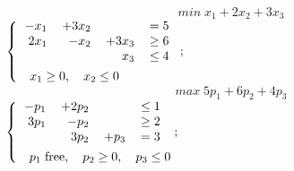\documentclass{article}
\begin{document}
\begin{preview}
\begin{center}
                        \begin{equation*}
                                min \; x_1 + 2 x_2 + 3 x_3
                        \end{equation*}
                        \begin{math}
                                \begin{dcases}
                                        \begin{tabular}{r r r l}
                                                $ - x_1 $ & $ + 3 x_2 $ & & $ = 5 $ \\
                                                $ 2 x_1 $ & $ - x_2 $ & $ + 3 x_3 $ & $ \geq{6} $ \\
                                                & & $ x_3 $ & $ \leq{4} $
                                        \end{tabular} \\
                                        \quad
                                        x_1 \geq{0}, \quad x_2 \leq{0}
                                \end{dcases};
                        \end{math}
                        \begin{equation*}
                                max \; 5 p_1 + 6 p_2 + 4 p_3
                        \end{equation*}
                        \begin{math}
                                \begin{dcases}
                                        \begin{tabular}{r r r l}
                                                $ - p_1 $ & $ + 2 p_2 $ & & $ \leq{1} $ \\
                                                $ 3 p_1 $ & $ - p_2 $ & & $ \geq{2} $ \\
                                                & $ 3 p_2 $ & $ + p_3 $ & $ = 3 $ \\
                                        \end{tabular} \\
                                        \quad
                                        p_1 \; \text{free},\quad p_2 \geq{0}, \quad p_3 \leq{0}
                                \end{dcases};
                        \end{math}
                \end{center}
        \end{preview}
\end{document}
